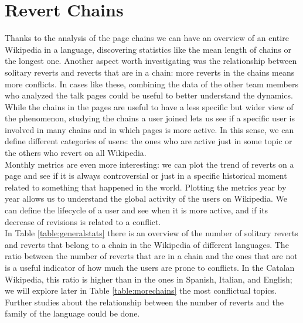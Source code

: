 \section{Revert Chains}
Thanks to the analysis of the page chains we can have an overview of an entire Wikipedia in a
language, discovering statistics like the mean length of chains or the longest one. Another aspect
worth investigating was the relationship between solitary reverts and reverts that are in a chain: more
reverts in the chains means more conflicts. In cases like these, combining the data of the other team
members who analyzed the talk pages could be useful to better understand the dynamics. While the chains in
the pages are useful to have a less specific but wider view of the phenomenon, studying the chains a
user joined lets us see if a specific user is involved in many chains and in which pages is more
active. In this sense, we can define different categories of users: the ones who are active just in
some topic or the others who revert on all Wikipedia. \\

Monthly metrics are even more interesting: we can plot the trend of reverts on a page and see if it
is always controversial or just in a specific historical moment related to something that happened
in the world. Plotting the metrics year by year allows us to understand the global activity of the
users on Wikipedia. We can define the lifecycle of a user and see when it is more active, and if
its decrease of revisions is related to a conflict.\\


In Table \ref{table:generalstats} there is an overview of the number of solitary reverts and reverts
that belong to a chain in the Wikipedia of different languages. The ratio between the number of
reverts that are in a chain and the ones that are not is a useful indicator of how much the users
are prone to conflicts. In the Catalan Wikipedia, this ratio is higher than in the ones in Spanish,
Italian, and English; we will explore later in Table \ref{table:morechains} the most conflictual topics.
Further studies about the relationship between the number of reverts and the family of the language could be done.

